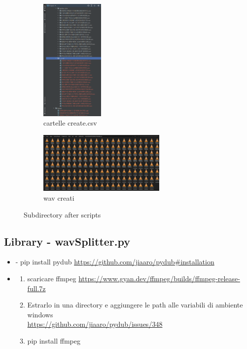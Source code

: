 \documentclass{article}
\begin{document}
\begin{figure}[h]
    \begin{subfigure}{0.5\textwidth}
    \includegraphics[width=0.9\linewidth, height= 6cm]{image/dirSplit.png} 
    \caption{cartelle create.csv}
    \label{fig:subim1}
    \end{subfigure}
    \begin{subfigure}{0.5\textwidth}
    \includegraphics[width=0.9\linewidth, height= 3cm]{image/dirSplitted.png}
    \caption{wav creati }
    \label{fig:subim2}
    \end{subfigure}
    \caption{Subdirectory after scripts}
    \label{fig:image2}
    \end{figure}

\subsection{Library - wavSplitter.py}
    \begin{itemize}
        \item -   pip install pydub \url{https://github.com/jiaaro/pydub#installation}
        \item  
        \begin{enumerate}
            \item scaricare ffmpeg \url{https://www.gyan.dev/ffmpeg/builds/ffmpeg-release-full.7z}
            \item Estrarlo in una directory e aggiungere le path alle variabili di ambiente windows     \\\url{https://github.com/jiaaro/pydub/issues/348}
            \item pip install ffmpeg
        \end{enumerate}
    \end{itemize}
\end{document}
